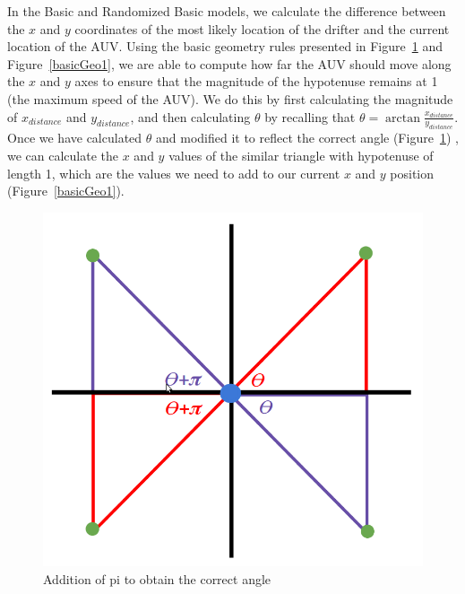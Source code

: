 \documentclass[a4paper, 11pt]{article} %
\begin{document}
In the Basic and Randomized Basic models, we calculate the difference between the $x$ and $y$ coordinates of the most likely location of the drifter and the current location of the AUV. Using the basic geometry rules presented in Figure~\ref{basicGeo2} and Figure~\ref{basicGeo1}, we are able to compute how far the AUV should move along the $x$ and $y$ axes to ensure that the magnitude of the hypotenuse remains at 1 (the maximum speed of the AUV). We do this by first calculating the magnitude of $x_{distance}$ and $y_{distance}$, and then calculating $\theta$ by recalling that $\theta = \arctan{\frac{x_{distance}}{y_{distance}}}$. Once we have calculated $\theta$ and modified it to reflect the correct angle (Figure~\ref{basicGeo2}) , we can calculate the $x$ and $y$ values of the similar triangle with hypotenuse of length 1, which are the values we need to add to our current $x$ and $y$ position (Figure~\ref{basicGeo1}).

\begin{figure}[H]
	\begin{center}
		\includegraphics[scale=0.20]{angles.png}
	\end{center}
\caption{Addition of pi to obtain the correct angle \label{basicGeo2}}
\end{figure}
\end{document}
